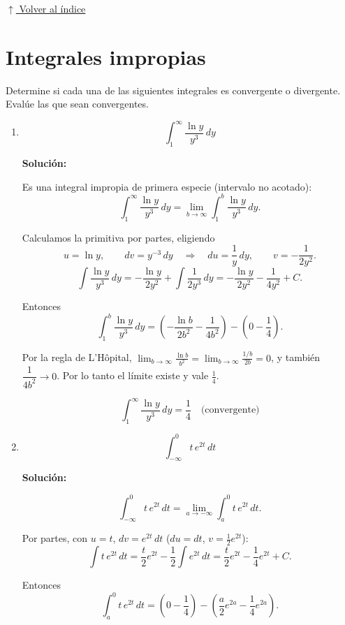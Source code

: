 \documentclass[12pt]{article}
\newcommand{\solucion}{%
    \vspace{0.8em}%
    \textbf{Solución:}%
}
\newcommand{\volverindice}{%
    \vspace{1em}%
    \begin{flushright}%
        \hyperlink{indice}{\small $\uparrow$ Volver al índice}%
    \end{flushright}%
}
\begin{document}
\volverindice
\newpage


\section{Integrales impropias}

Determine si cada una de las siguientes integrales es convergente o
divergente. Evalúe las que sean convergentes.

\begin{enumerate}[label=\alph*.-]

    \item
    \[
    \int_{1}^{\infty}\frac{\ln y}{y^3}\,dy
    \]

    \solucion

    Es una integral impropia de primera especie (intervalo no acotado):
    \[
    \int_{1}^{\infty}\frac{\ln y}{y^3}\,dy
    =\lim_{b\to\infty}\int_{1}^{b}\frac{\ln y}{y^3}\,dy.
    \]

    Calculamos la primitiva por partes, eligiendo
    \[
    u=\ln y,\qquad dv=y^{-3}\,dy
    \quad\Rightarrow\quad
    du=\frac1y\,dy,\qquad v=-\frac{1}{2y^2}.
    \]
    \[
    \int\frac{\ln y}{y^3}\,dy
    =-\frac{\ln y}{2y^2}+\int\frac{1}{2y^3}\,dy
    =-\frac{\ln y}{2y^2}-\frac{1}{4y^2}+C.
    \]

    Entonces
    \[
    \int_{1}^{b}\frac{\ln y}{y^3}\,dy
    =\left(-\frac{\ln b}{2b^2}-\frac{1}{4b^2}\right)-\left(0-\frac14\right).
    \]

    Por la regla de L'Hôpital,
    $\displaystyle\lim_{b\to\infty}\frac{\ln b}{b^2}=\lim_{b\to\infty}\frac{1/b}{2b}=0$,
    y también $\dfrac{1}{4b^2}\to0$. Por lo tanto el límite existe y vale
    $\frac14$.

    \[
    \boxed{
    \int_{1}^{\infty}\frac{\ln y}{y^3}\,dy=\frac14
    \quad\text{(convergente)}
    }
    \]


    \item
    \[
    \int_{-\infty}^{0}t\,e^{2t}\,dt
    \]

    \solucion

    \[
    \int_{-\infty}^{0}t\,e^{2t}\,dt=\lim_{a\to-\infty}\int_{a}^{0}t\,e^{2t}\,dt.
    \]

    Por partes, con $u=t$, $dv=e^{2t}\,dt$ ($du=dt$, $v=\frac12e^{2t}$):
    \[
    \int t\,e^{2t}\,dt=\frac{t}{2}e^{2t}-\frac12\int e^{2t}\,dt
    =\frac{t}{2}e^{2t}-\frac14e^{2t}+C.
    \]

    Entonces
    \[
    \int_{a}^{0}t\,e^{2t}\,dt
    =\left(0-\frac14\right)-\left(\frac{a}{2}e^{2a}-\frac14e^{2a}\right).
    \]


\end{enumerate}
\end{document}
